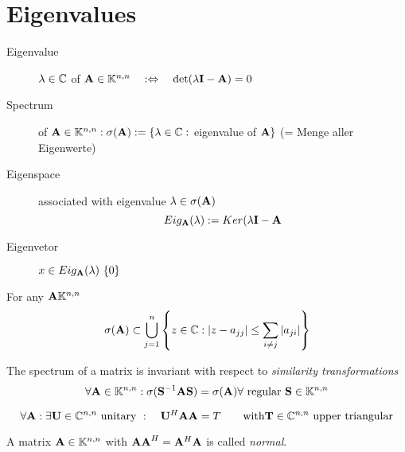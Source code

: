 \section{Eigenvalues}
	\begin{definition}
	 \begin{description}
	  \item[Eigenvalue] $\lambda \in \mathbb{C}$ of $\mathbf{A} \in \mathbb{K}^{n,n} \quad :\Leftrightarrow  \quad \det(\lambda \mathbf{I} - \mathbf{A}) = 0$
	  \item[Spectrum] of $\mathbf{A} \in \mathbb{K}^{n,n}: \sigma(\mathbf{A}):= \{\lambda \in \mathbb{C}:$ eigenvalue of $\mathbf{A}\}$ (= Menge aller Eigenwerte)
	  \item[Eigenspace] associated with eigenvalue $\lambda \in \sigma(\mathbf{A})$
		\[
		 Eig_{\mathbf{A}}(\lambda) := Ker(\lambda \mathbf{I} - \mathbf{A}
		\]
	  \item[Eigenvetor] $x\in Eig_{\mbf A}(\lambda) \ \{0\}$
	 \end{description}
	\end{definition}
	
	\begin{lemma}
		For any $\mathbf{A} \mathbb{K}^{n,n}$
		\[
		\sigma(\mathbf{A}) \subset \bigcup_{j=1}^n \left\{z \in \mathbb{C}: |z-a_{jj}| \leq \sum_{i\neq j} |a_{ji}|\right\}
		\]
	\end{lemma}
	
	\begin{lemma}
	 The spectrum of a matrix is invariant with respect to \emph{similarity transformations}
	 \[
	  \forall \mathbf{A} \in \mathbb{K}^{n,n}: \sigma(\mathbf{S}^{-1} \mathbf{A} \mathbf{S}) = \sigma(\mathbf{A}) \forall \text{ regular } \mathbf{S} \in \mathbb{K}^{n,n}
	 \]
	\end{lemma}
	
	\begin{theorem}
		\[
		 \forall \mathbf{A}: \exists \mathbf{U} \in \mathbb{C}^{n,n} \text{ unitary }: \quad \mathbf{U}^H \mathbf{A} \mathbf{A} = T \qquad \text{with} \mathbf{T} \in \mathbb{C}^{n,n} \text{ upper triangular}
		\]
	\end{theorem}
	
	A matrix $\mathbf{A} \in \mathbb{K}^{n,n}$ with $\mathbf{AA}^H = \mathbf{A}^H \mathbf{A}$ is called \emph{normal}.